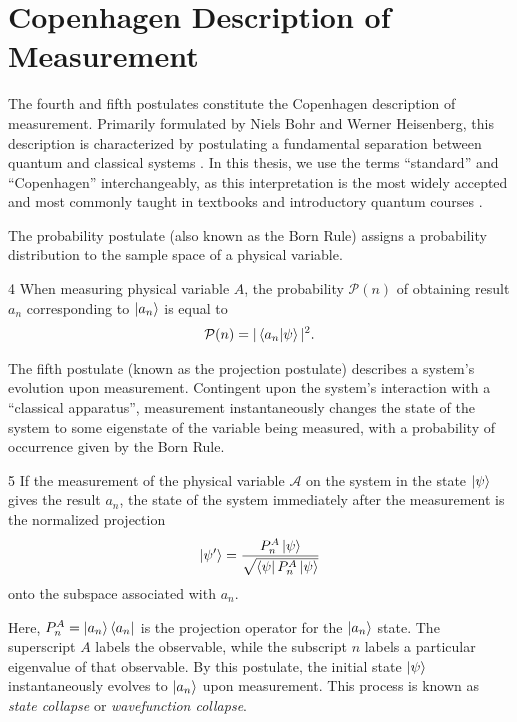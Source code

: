 \section{Copenhagen Description of Measurement}
The fourth and fifth postulates constitute the Copenhagen description of measurement. Primarily formulated by Niels Bohr and Werner Heisenberg, this description is characterized by postulating a fundamental separation between quantum and classical systems \cite{Schlosshauer}. In this thesis, we use the terms ``standard'' and ``Copenhagen'' interchangeably, as this interpretation is the most widely accepted and most commonly taught in textbooks and introductory quantum courses \cite{siddiqui}.

The probability postulate (also known as the Born Rule) assigns a probability distribution to the sample space of a physical variable.
\begin{Thm:Postulate}{4}
    When measuring physical variable $A$, the probability $\mathcal{P}(n)$ of obtaining result $a_n$ corresponding to $\ket{a_n}$  is equal to
     \begin{align}
        \mathcal{P}(n) = |\braket{a_n|\psi}|^2.
    \end{align}
\end{Thm:Postulate}


The fifth postulate (known as the projection postulate) describes a system's evolution upon measurement. Contingent upon the system's interaction with a ``classical apparatus'', measurement instantaneously changes the state of the system to some eigenstate of the variable being measured, with a probability of occurrence given by the Born Rule.

\begin{Thm:Postulate}{5} \label{projection postulate}
    If the measurement of the physical variable $\mathcal{A}$ on the system in the state $\ket{\psi}$ gives the result $a_n$, the state of the system immediately after the measurement is the normalized projection
    \begin{align}
        \ket{\psi^\prime} = \frac{P^A_n\ket{\psi}}{\sqrt{\bra{\psi}P^A_n\ket{\psi}
        }}
    \end{align}
    onto the subspace associated with $a_n$.
\end{Thm:Postulate}
Here, $P^A_n = \ket{a_n}\bra{a_n}$ is the projection operator for the $\ket{a_n}$ state. The superscript $A$ labels the observable, while the subscript $n$ labels a particular eigenvalue of that observable. By this postulate, the initial state $\ket{\psi}$ instantaneously evolves to $\ket{a_n}$ upon measurement. This process is known as \textit{state collapse} or \textit{wavefunction collapse}.

